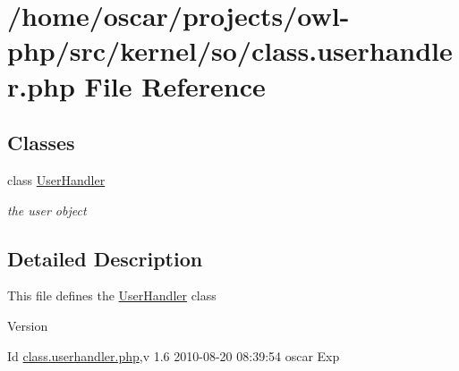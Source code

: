 \section{/home/oscar/projects/owl-\/php/src/kernel/so/class.userhandler.php File Reference}
\label{class_8userhandler_8php}
\subsection*{Classes}
\begin{DoxyCompactItemize}
\item 
class \hyperlink{classUserHandler}{UserHandler}
\begin{DoxyCompactList}\small\item\em the user object \item\end{DoxyCompactList}\end{DoxyCompactItemize}


\subsection{Detailed Description}
This file defines the \hyperlink{classUserHandler}{UserHandler} class \begin{DoxyVersion}{Version}

\end{DoxyVersion}
\begin{DoxyParagraph}{Id}
\hyperlink{class_8userhandler_8php}{class.userhandler.php},v 1.6 2010-\/08-\/20 08:39:54 oscar Exp 
\end{DoxyParagraph}
